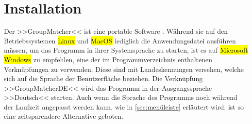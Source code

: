 \chapter{Installation}
\label{ch:installation}

Der >>GroupMatcher<< ist eine portable Software . Während sie auf den Betriebssystemen \hl{Linux} und \hl{MacOS} lediglich die Anwendungsdatei ausführen müssen, um das Programm in ihrer Systemsprache zu starten, ist es auf \hl{Microsoft Windows} zu empfehlen, eine der im Programmverzeichnis enthaltenen Verknüpfungen zu verwenden. Diese sind mit Landeskennungen  versehen, welche sich auf die Sprache der Benutzerfläche beziehen. Die Verknüpfung >>GroupMatcherDE<< wird das Programm in der Ausgangssprache >>Deutsch<< starten. Auch wenn die Sprache des Programms noch während der Laufzeit angepasst werden kann, wie in \ref{sec:menüleiste} erläutert wird, ist so eine zeitsparendere Alternative geboten.
